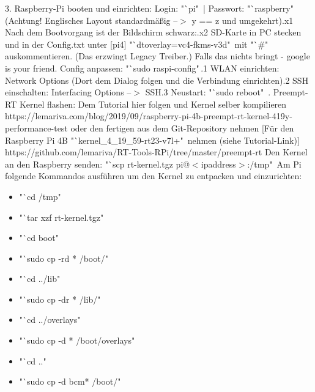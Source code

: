 \documentclass[12pt,a4paper,bibliography=totoc,listof=totoc]{scrartcl}
\begin{document}
3. Raspberry-Pi booten und einrichten:
 Login: "`pi"\, | Passwort: "`raspberry"\, (Achtung! Englisches Layout standardmäßig --$>$ y == z und umgekehrt).x1 Nach dem Bootvorgang ist der Bildschirm schwarz:.x2 SD-Karte in PC stecken und in der Config.txt unter [pi4] "`dtoverlay=vc4-fkms-v3d"\, mit "`\#"\, auskommentieren.
       (Das erzwingt Legacy Treiber.) Falls das nichts bringt - google is your friend.
 Config anpassen: "`sudo raspi-config"\,.1 WLAN einrichten: Network Options (Dort dem Dialog folgen und die Verbindung einrichten).2 SSH einschalten: Interfacing Options --$>$ SSH.3 Neustart: "`sudo reboot"\,\newline
{}. Preempt-RT Kernel flashen: Dem Tutorial hier folgen und Kernel selber kompilieren\newline
    https://lemariva.com/blog/2019/09/raspberry-pi-4b-preempt-rt-kernel-419y-performance-test
    oder den fertigen aus dem Git-Repository nehmen [Für den Raspberry Pi 4B "`kernel\_4\_19\_59-rt23-v7l+"\, nehmen (siehe Tutorial-Link)]
    https://github.com/lemariva/RT-Tools-RPi/tree/master/preempt-rt Den Kernel an den Raspberry senden: "`scp rt-kernel.tgz pi@$<$ipaddress$>$:/tmp"\, Am Pi folgende Kommandos ausführen um den Kernel zu entpacken und einzurichten:\newline
\begin{itemize}
    \item "`cd /tmp"\,
    \item "`tar xzf rt-kernel.tgz"\,
    \item "`cd boot"\,
    \item "`sudo cp -rd * /boot/"\,
    \item "`cd ../lib"\,
    \item "`sudo cp -dr * /lib/"\,
    \item "`cd ../overlays"\,
    \item "`sudo cp -d * /boot/overlays"\,
    \item "`cd .."\,
    \item "`sudo cp -d bcm* /boot/"\,
\end {itemize}
\end{document}
